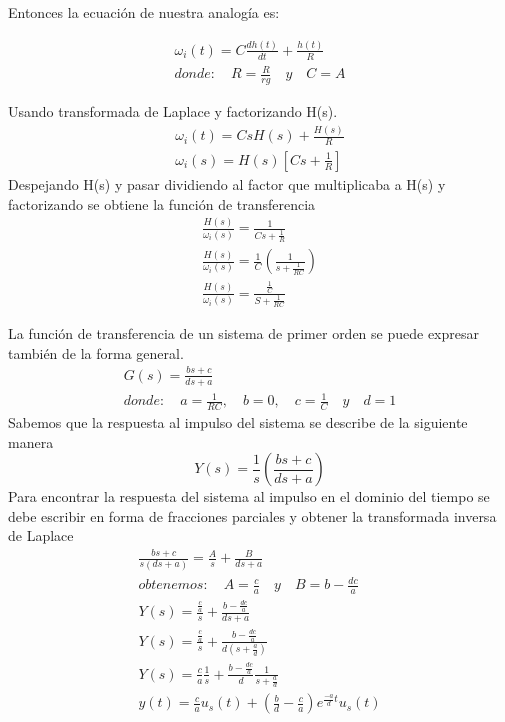\documentclass{article}
\begin{document}
	 Entonces la ecuación de nuestra analogía es:
	 
	 \begin{equation}
	 \begin{split}
 \omega_i(t)=C\frac{dh(t)}{dt}+\frac{h(t)}{R}\\
donde:\quad R=\frac{R}{rg}\quad y\quad C=A
	 \end{split} \label{ana}
	 \end{equation}
	 
	 Usando transformada de Laplace y factorizando H(s).
	 \begin{align}
	 \omega_i(t)= CsH(s)+ \frac{H(s)}{R}\\ \label{eqs}
	 \omega_i(s)=H(s)\left[Cs+\frac{1}{R}\right]
	 \end{align}
	 Despejando H(s) y pasar dividiendo al factor que multiplicaba a H(s) y factorizando se obtiene la función de transferencia 
	 \begin{align}
	 \frac{H(s)}{\omega_i(s)}=\frac{1}{Cs+ \frac{1}{R}}\\
\frac{H(s)}{\omega_i(s)}=\frac{1}{C}\left(\frac{1}{s+\frac{1}{RC}}\right)\\
\frac{H(s)}{\omega_i(s)}=\frac{\frac{1}{C}}{S+\frac{1}{RC}}
	 \end{align} 
	 
	 La función de transferencia de un sistema de primer orden se puede expresar también de la forma general.
	 \begin{equation}
	 \begin{split}
	 G(s)=\frac{bs+c}{ds+a}\\
	 donde:\quad a=\frac{1}{RC},\quad b=0,\quad c=\frac{1}{C}\quad y \quad d=1
	 \end{split} \label{trans}
	 \end{equation}
	 Sabemos que la respuesta al impulso del sistema se describe de la siguiente manera
	 \begin{equation}
	 Y(s)=\frac{1}{s}\left(\frac{bs+c}{ds+a}\right)
	 \end{equation}
	 Para encontrar la respuesta del sistema al impulso en el dominio del tiempo se debe escribir en forma de fracciones parciales y obtener la transformada inversa de Laplace
	 \begin{align}
	 \frac{bs+c}{s(ds+a)}=\frac{A}{s}+\frac{B}{ds+a}\\
	 obtenemos:\quad A=\frac{c}{a}\quad y\quad B=b-\frac{dc}{a}\\
	 Y(s)=\frac{\frac{c}{a}}{s}+\frac{b-\frac{dc}{a}}{ds+a}\\
	 Y(s)=\frac{\frac{c}{a}}{s}+\frac{b-\frac{dc}{a}}{d(s+\frac{a}{d})}\\
	 Y(s)=\frac{c}{a}\frac{1}{s}+\frac{b-\frac{dc}{a}}{d}\frac{1}{s+\frac{a}{d}}\\
	 y(t)= \frac{c}{a}u_s(t)+\left(\frac{b}{d}-\frac{c}{a}\right)e^{\frac{-a}{d}t}u_s(t) \label{rt}
	 \end{align} 
	 
\end{document}
